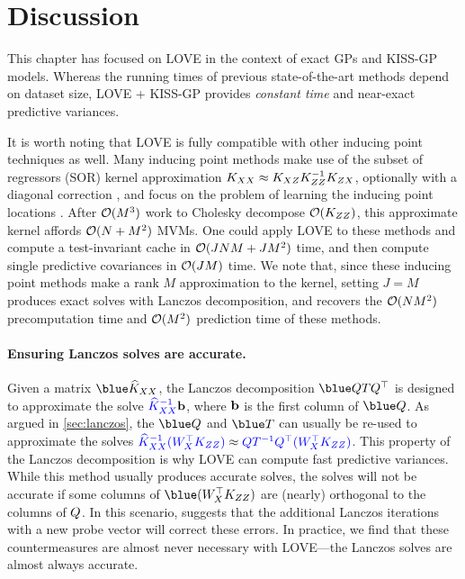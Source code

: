 \section{Discussion}
\label{sec:love_discussion}

This chapter has focused on LOVE{} in the context of exact GPs and KISS-GP models.
Whereas the running times of previous state-of-the-art methods depend on dataset size, LOVE{} + KISS-GP provides \emph{constant time} and near-exact predictive variances.

It is worth noting that LOVE is fully compatible with other inducing point techniques as well.
Many inducing point methods make use of the subset of regressors (SOR) kernel approximation $K_{XX} \approx K_{XZ}K_{ZZ}^{-1}K_{ZX}$,
optionally with a diagonal correction \cite{snelson2006sparse}, and focus on the problem of learning the inducing point locations \cite{quinonero2005unifying,titsias2009variational}.
After $\bigo{M^{3}}$ work to Cholesky decompose $\bigo{\bK_{\bZ\bZ}}$, this approximate kernel affords $\bigo{N + M^{2}}$ MVMs.
One could apply LOVE to these methods and compute a test-invariant cache in $\bigo{JNM+JM^{2}}$ time, and then compute single predictive covariances in $\bigo{JM}$ time.
We note that, since these inducing point methods make a rank $M$ approximation to the kernel, setting $J\!=\!M$ produces exact solves with Lanczos decomposition, and recovers the $\bigo{NM^{2}}$ precomputation time and $\bigo{M^2}$ prediction time of these methods.

\paragraph{Ensuring Lanczos solves are accurate.}
Given a matrix $\blue \trainK$, the Lanczos decomposition $\blue \bQ \bT \bQ^\top$ is designed to approximate the solve ${\color{blue} \widehat{K}_{XX}^{-1}} \mathbf{b}$, where $\mathbf{b}$ is the first column of $\blue \bQ$.
As argued in \cref{sec:lanczos}, the $\blue \bQ$ and $\blue \bT$ can usually be re-used to approximate the solves ${\color{blue} \widehat {K}_{XX}^{-1} (W_{X}^\top K_{ZZ})} \approx {\color{blue} \ensuremath{Q}\ensuremath{T}^{-1} \ensuremath{Q}^\top (\ensuremath{W}_{\ensuremath{X}}^\top \ensuremath{K}_{\ensuremath{Z}\ensuremath{Z}})}$.
This property of the Lanczos decomposition is why LOVE{} can compute fast predictive variances.
While this method usually produces accurate solves, the solves will not be accurate if some columns of $\blue (\bW^\top_{\bX} \bK_{\bZ\bZ})$ are (nearly) orthogonal to the columns of $Q$.
In this scenario, \citet{saad1987lanczos} suggests that the additional Lanczos iterations with a new probe vector will correct these errors.
In practice, we find that these countermeasures are almost never necessary with LOVE{}---the Lanczos solves are almost always accurate.

